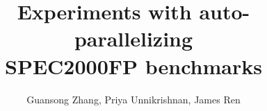 
\date{}      %

\title{\bf Experiments with auto-parallelizing \\ SPEC2000FP benchmarks}

\author{Guansong Zhang, Priya Unnikrishnan, James Ren}




\maketitle

\thispagestyle{empty}
